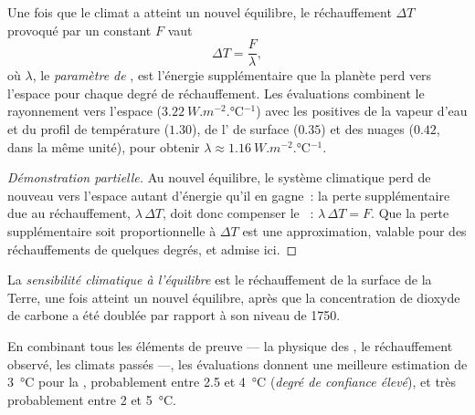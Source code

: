 \begin{proposition}\label{prop:g12:climate-change:equilibrium}
Une fois que le climat a atteint un nouvel équilibre, le réchauffement
$\Delta T$ provoqué par un  constant $F$ vaut
\[
  \Delta T = \frac{F}{\lambda},
\]
où $\lambda$, le \emph{paramètre de }, est l'énergie
supplémentaire que la planète perd vers l'espace pour chaque degré de
réchauffement. Les évaluations combinent le rayonnement vers l'espace
($\qty{3.22}{W.m^{-2}.\degreeCelsius^{-1}}$) avec les 
positives de la vapeur d'eau et du profil de température ($1.30$), de
l' de surface ($0.35$) et des nuages ($0.42$, dans la même unité),
pour obtenir $\lambda \approx \qty{1.16}{W.m^{-2}.\degreeCelsius^{-1}}$.
\end{proposition}

\begin{proof}[Démonstration partielle]
Au nouvel équilibre, le système climatique perd de nouveau vers l'espace
autant d'énergie qu'il en gagne~: la perte supplémentaire due au
réchauffement, $\lambda\,\Delta T$, doit donc compenser le ~:
$\lambda\,\Delta T = F$. Que la perte supplémentaire soit proportionnelle à
$\Delta T$ est une approximation, valable pour des réchauffements de
quelques degrés, et admise ici.
\end{proof}

\begin{definition}\label{def:g12:climate-change:ecs}
La \emph{sensibilité climatique à l'équilibre}
est le réchauffement de la surface de la Terre, une fois atteint un nouvel
équilibre, après que la concentration de dioxyde de carbone a été doublée
par rapport à son niveau de 1750.
\end{definition}

\begin{proposition}\label{prop:g12:climate-change:ecs}
En combinant tous les éléments de preuve --- la physique des ,
le réchauffement observé, les climats passés ---, les évaluations donnent
une meilleure estimation de \qty{3}{\degreeCelsius} pour la , probablement entre 2.5 et
\qty{4}{\degreeCelsius} (\emph{degré de confiance élevé}), et très
probablement entre 2 et \qty{5}{\degreeCelsius}.
\end{proposition}

